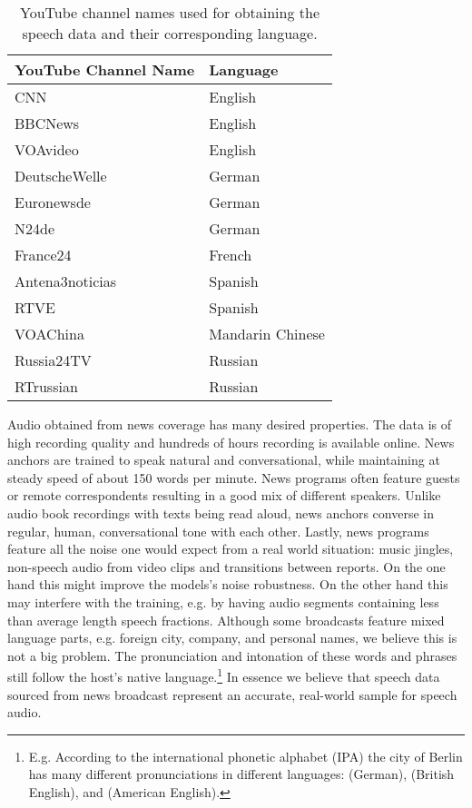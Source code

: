 	\begin{table}[]
	\centering
	\begin{tabularx}{\textwidth}{ll}
	\toprule
	YouTube Channel Name  & Language \\ \midrule
	CNN                   & English \\
	BBCNews               & English \\
	VOAvideo              & English \\
	DeutscheWelle         & German \\
	Euronewsde            & German \\
	N24de                 & German \\
	France24              & French \\
	Antena3noticias       & Spanish \\
	RTVE                  & Spanish \\
	VOAChina              & Mandarin Chinese  \\
	Russia24TV            & Russian \\
	RTrussian             & Russian \\ \bottomrule
	\end{tabularx}
	\caption{YouTube channel names used for obtaining the speech data and their corresponding language.}
	\label{tab:channels}
	\end{table}

  	
  	Audio obtained from news coverage has many desired properties. The data is of high recording quality and hundreds of hours recording is available online. News anchors are trained to speak natural and conversational, while maintaining at steady speed of about 150 words per minute\cite{Kantilaftis2016}. News programs often feature guests or remote correspondents resulting in a good mix of different speakers. Unlike audio book recordings with texts being read aloud, news anchors converse in regular, human, conversational tone with each other. Lastly, news programs feature all the noise one would expect from a real world situation: music jingles, non-speech audio from video clips and transitions between reports. On the one hand this might improve  the models's noise robustness. On the other hand this may interfere with the training, e.g. by having audio segments containing less than average length speech fractions. Although some broadcasts feature mixed language parts, e.g. foreign city, company, and personal names, we believe this is not a big problem. The pronunciation  and intonation of these words and phrases still follow the host's native language.\footnote{E.g. According to the international phonetic alphabet (IPA) the city of Berlin has many different pronunciations in different languages:  (German),  (British English), and  (American English).} In essence we believe that speech data sourced from news broadcast represent an accurate, real-world sample for speech audio.
  	

